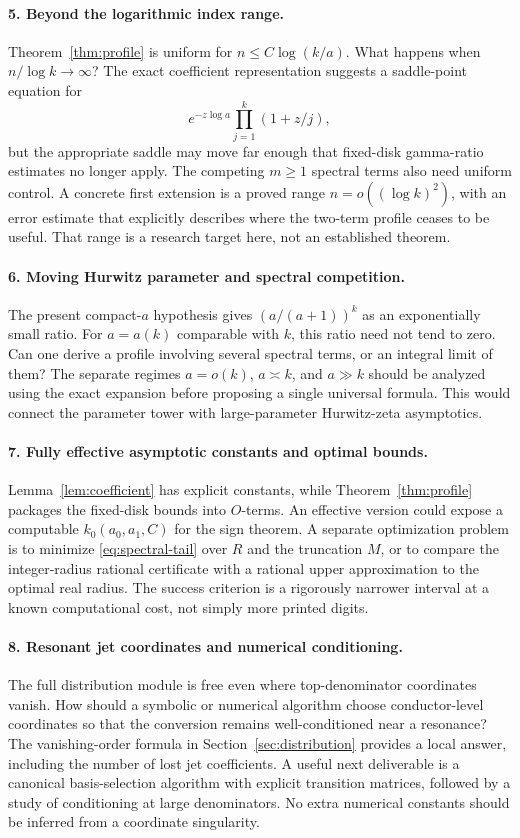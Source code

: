 \paragraph{5. Beyond the logarithmic index range.}
Theorem~\ref{thm:profile} is uniform for \(n\le C\log(k/a)\).
What happens when \(n/\log k\to\infty\)? The exact coefficient
representation suggests a saddle-point equation for
\[
e^{-z\log a}\prod_{j=1}^{k}(1+z/j),
\]
but the appropriate saddle may move far enough that fixed-disk
gamma-ratio estimates no longer apply. The competing \(m\ge1\)
spectral terms also need uniform control.
A concrete first extension is a proved range
\(n=o((\log k)^2)\), with an error estimate that explicitly describes
where the two-term profile ceases to be useful. That range is a
research target here, not an established theorem.

\paragraph{6. Moving Hurwitz parameter and spectral competition.}
The present compact-\(a\) hypothesis gives
\((a/(a+1))^k\) as an exponentially small ratio.
For \(a=a(k)\) comparable with \(k\), this ratio need not tend to zero.
Can one derive a profile involving several spectral terms, or an
integral limit of them? The separate regimes
\(a=o(k)\), \(a\asymp k\), and \(a\gg k\) should be analyzed using
the exact expansion before proposing a single universal formula.
This would connect the parameter tower with large-parameter
Hurwitz-zeta asymptotics.

\paragraph{7. Fully effective asymptotic constants and optimal bounds.}
Lemma~\ref{lem:coefficient} has explicit constants, while
Theorem~\ref{thm:profile} packages the fixed-disk bounds into \(O\)-terms.
An effective version could expose a computable \(k_0(a_0,a_1,C)\)
for the sign theorem. A separate optimization problem is to minimize
\eqref{eq:spectral-tail} over \(R\) and the truncation \(M\), or to
compare the integer-radius rational certificate with a rational
upper approximation to the optimal real radius.
The success criterion is a rigorously narrower interval at a known
computational cost, not simply more printed digits.

\paragraph{8. Resonant jet coordinates and numerical conditioning.}
The full distribution module is free even where top-denominator
coordinates vanish. How should a symbolic or numerical algorithm
choose conductor-level coordinates so that the conversion remains
well-conditioned near a resonance? The vanishing-order formula in
Section~\ref{sec:distribution} provides a local answer, including the
number of lost jet coefficients. A useful next deliverable is a
canonical basis-selection algorithm with explicit transition matrices,
followed by a study of conditioning at large denominators.
No extra numerical constants should be inferred from a coordinate
singularity.

